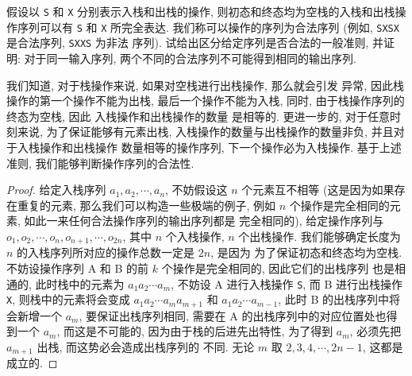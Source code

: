 \documentclass[10pt,UTF8]{book} %
\begin{document}
\begin{exercise}
    假设以 \lstinline|S| 和 \lstinline|X| 分别表示入栈和出栈的操作,
    则初态和终态均为空栈的入栈和出栈操作序列可以有 \lstinline|S|
    和 \lstinline|X| 所完全表达. 我们称可以操作的序列为合法序列
    (例如, \lstinline|SXSX| 是合法序列, \lstinline|SXXS| 为非法
    序列). 试给出区分给定序列是否合法的一般准则, 并证明: 
    对于同一输入序列, 两个不同的合法序列不可能得到相同的输出序列.
    \begin{cmt}
        我们知道, 对于栈操作来说, 如果对空栈进行出栈操作, 那么就会引发
        异常, 因此{\kaishu 栈操作的第一个操作不能为出栈, 最后一个操作不能为入栈}, 
        同时,
        由于栈操作序列的终态为空栈, 因此 {\kaishu 入栈操作和出栈操作的数量
        是相等的}. 更进一步的, 对于任意时刻来说, 为了保证能够有元素出栈,
        {\kaishu 入栈操作的数量与出栈操作的数量非负, 并且对于入栈操作和出栈操作
        数量相等的操作序列, 下一个操作必为入栈操作}.
        基于上述准则, 我们能够判断操作序列的合法性.
    \end{cmt}
    \begin{proof}
        给定入栈序列 $a_1, a_2, \cdots, a_n$, 不妨假设这 $n$ 个元素互不相等
        (这是因为如果存在重复的元素, 那么我们可以构造一些极端的例子, 
        例如 $n$ 个操作是完全相同的元素, 如此一来任何合法操作序列的输出序列都是
        完全相同的), 给定操作序列与
        $o_1, o_2, \cdots, o_n, o_{n+1}, \cdots, o_{2n}$,
        其中 $n$ 个入栈操作, $n$ 个出栈操作.
        我们能够确定长度为 $n$ 的入栈序列所对应的操作总数一定是 $2n$, 是因为
        为了保证初态和终态均为空栈.
        不妨设操作序列 A 和 B 的前 $k$ 个操作是完全相同的, 因此它们的出栈序列
        也是相通的, 此时栈中的元素为
        $a_1a_2\cdots a_m$, 不妨设 A 进行入栈操作 \lstinline|S|, 
        而 B 进行出栈操作 \lstinline|X|,
        则栈中的元素将会变成 $a_1a_2\cdots a_m a_{m+1}$ 和 
        $a_1a_2\cdots a_{m-1}$, 此时 B 的出栈序列中将会新增一个 $a_m$,
        要保证出栈序列相同, 需要在 A 的出栈序列中的对应位置处也得到一个 $a_m$, 而这是不可能的,
        因为由于栈的后进先出特性, 
        为了得到 $a_m$, 必须先把 $a_{m+1}$ 出栈, 而这势必会造成出栈序列的
        不同. 无论 $m$ 取 $2,3,4,\cdots,2n-1$, 这都是成立的.
    \end{proof}
\end{exercise}


\end{document}
